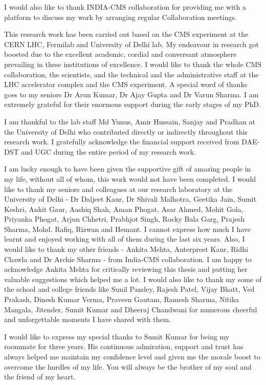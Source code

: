 I would also like to thank INDIA-CMS collaboration for providing me with a platform to discuss my work by arranging regular Collaboration meetings. 

This research work has been carried out based on the CMS experiment at the CERN LHC, Fermilab and University of Delhi lab. My endeavour in research got boosted due to the excellent academic, cordial and conversant atmosphere prevailing in these institutions of excellence. I would like to thank the whole CMS collaboration, the scientists, and the technical and the administrative staff at the LHC accelerator complex and the CMS experiment. A special word of thanks goes to my seniors Dr Arun Kumar, Dr Ajay Gupta and Dr Varun Sharma. I am extremely grateful for their enormous support during the early stages of my PhD.

I am thankful to the lab staff Md Yunus, Amir Hussain, Sanjay and Pradhan at the University of Delhi who contributed directly or indirectly throughout this research work. I gratefully acknowledge the financial support received from DAE-DST and UGC during the entire period of my research work.

I am lucky enough to have been given the supportive gift of amazing people in my life, without all of whom, this work would not have been completed. I would like to thank my seniors and colleagues at our research laboratory at the University of Delhi - Dr Daljeet Kaur, Dr Shivali Malhotra, Geetika Jain, Sumit Keshri, Ankit Gaur, Aashiq Shah, Aman Phogat, Asar Ahmed, Mohit Gola, Priyanka Phogat, Arjun Chhetri, Prabhjot Singh, Rocky Bala Garg, Prajesh Sharma, Mohd. Rafiq, Rizwan and Hemant. I cannot express how much I have learnt and enjoyed working with all of them during the last six years. Also, I would like to thank my other friends - Ankita Mehta, Anterpreet Kaur, Ridhi Chawla and Dr Archie Sharma - from India-CMS collaboration.
I am happy to acknowledge Ankita Mehta for critically reviewing this thesis and putting her valuable suggestions which helped me a lot. 
I would also like to thank my some of the school and college friends like Sunil Pandey, Rajesh Patel, Vijay Bhatt, Ved Prakash, Dinesh Kumar Verma, Praveen Gautam, Ramesh Sharma, Nitika Mangala, Jitender, Sumit Kumar and Dheeraj Chandwani for numerous cheerful and unforgettable moments I have shared with them.

I would like to express my special thanks to Sumit Kumar for being my roommate for three years. His continuous admiration, support and trust has always helped me maintain my confidence level and given me the morale boost to overcome the hurdles of my life. You will always be the brother of my soul and the friend of my heart.


